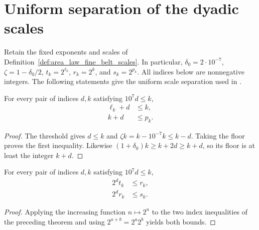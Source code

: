\section{Uniform separation of the dyadic scales}
\label{sec:area_law_scale_separation}

Retain the fixed exponents and scales of
Definition~\ref{def:area_law_fine_belt_scales}. In particular,
$\delta_0=2\cdot10^{-7}$, $\zeta=1-\delta_0/2$, $t_k=2^{\ell_k}$,
$r_k=2^k$, and $s_k=2^{p_k}$. All indices below are nonnegative integers.
The following statements give the uniform scale separation used in
\cite[Section~11]{OpenAI2026AreaLaw}.

\begin{lemma}
    \label{thm:area_law_scale_index_gaps}
    \leanok
    For every pair of indices $d,k$ satisfying $10^7d\le k$,
    \begin{align}
        \ell_k+d & \le k,   \\
        k+d      & \le p_k.
    \end{align}
\end{lemma}
\begin{proof}\leanok
    The threshold gives $d\le k$ and
    $\zeta k=k-10^{-7}k\le k-d$. Taking the floor proves the first
    inequality. Likewise $(1+\delta_0)k\ge k+2d\ge k+d$, so its floor
    is at least the integer $k+d$.
\end{proof}

\begin{lemma}
    \label{thm:area_law_scale_side_ratios}
    \leanok
    For every pair of indices $d,k$ satisfying $10^7d\le k$,
    \begin{align}
        2^d t_k & \le r_k, \\
        2^d r_k & \le s_k.
    \end{align}
\end{lemma}
\begin{proof}\leanok
    Applying the increasing function $n\mapsto2^n$ to the two index
    inequalities of the preceding theorem and using
    $2^{a+b}=2^a2^b$ yields both bounds.
\end{proof}

